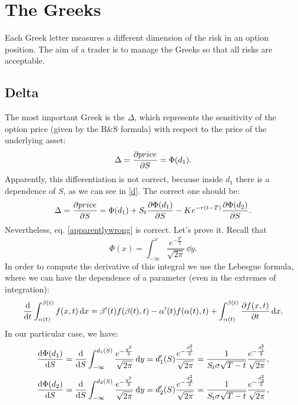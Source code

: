 \section{The Greeks}
Each Greek letter measures a different dimension of the risk in an option position. The aim of a trader is to manage the Greeks so that all risks are acceptable.

\subsection{Delta}
The most important Greek is the $\Delta$, which represents the sensitivity of the option price (given by the B\&S formula) with respect to the price of the underlying asset:
\begin{equation}\label{apparentlywrong}
    \Delta = \pdv{price}{S} = \Phi(d_1).
\end{equation}
Apparently, this differentiation is not correct, because inside $d_1$ there is a dependence of $S$, as we can see in \eqref{d}. The correct one should be:
\begin{equation}
    \Delta = \pdv{price}{S} = \Phi(d_1) + S_t\pdv{\Phi(d_1)}{S} - Ke^{-r(t-T)}\pdv{\Phi(d_2)}{S}.
\end{equation}
Nevertheless, eq. \eqref{apparentlywrong} is correct. Let's prove it. Recall that
\begin{equation*}
    \Phi(x) = \int_{-\infty}^x\dfrac{e^{-\frac{y^2}{2}}}{\sqrt{2\pi}}\,\dd y.
\end{equation*}
In order to compute the derivative of this integral we use the Lebesgue formula, where we can have the dependence of a parameter (even in the extremes of integration):
\begin{equation}
    \dv{t} \int_{\alpha(t)}^{\beta(t)}f(x,t)\,\dd x = \beta'(t)f(\beta(t),t)-\alpha'(t)f(\alpha(t),t) + \int_{\alpha(t)}^{\beta(t)}\pdv{f(x,t)}{t}\,\dd x.
\end{equation}
In our particular case, we have:
\begin{align}
    \dv{\Phi(d_1)}{S} = \dv{S}\int_{-\infty}^{d_1(S)}\dfrac{e^{-\frac{y^2}{2}}}{\sqrt{2\pi}}\,\dd y
    = d_1'(S)\dfrac{e^{-\frac{d_1^2}{2}}}{\sqrt{2\pi}}
    = \dfrac{1}{S_t\sigma\sqrt{T-t}}\dfrac{e^{-\frac{d_1^2}{2}}}{\sqrt{2\pi}},
\end{align}
\begin{align}
    \dv{\Phi(d_2)}{S} = \dv{S}\int_{-\infty}^{d_2(S)}\dfrac{e^{-\frac{y^2}{2}}}{\sqrt{2\pi}}\,\dd y
    = d_2'(S)\dfrac{e^{-\frac{d_2^2}{2}}}{\sqrt{2\pi}}
    = \dfrac{1}{S_t\sigma\sqrt{T-t}}\dfrac{e^{-\frac{d_2^2}{2}}}{\sqrt{2\pi}},
\end{align}
